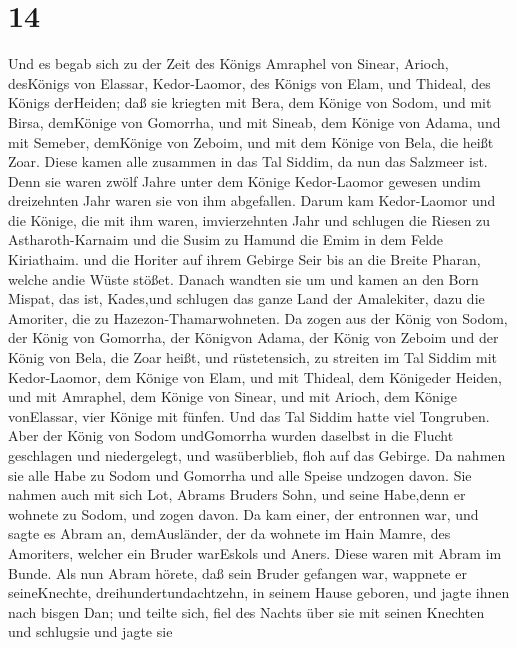 \hypertarget{section-13}{%
\section{14}\label{section-13}}

 Und es begab sich zu der Zeit des Königs Amraphel von
Sinear, Arioch, desKönigs von Elassar, Kedor-Laomor, des Königs von
Elam, und Thideal, des Königs derHeiden;  daß sie kriegten
mit Bera, dem Könige von Sodom, und mit Birsa, demKönige von Gomorrha,
und mit Sineab, dem Könige von Adama, und mit Semeber, demKönige von
Zeboim, und mit dem Könige von Bela, die heißt Zoar.  Diese
kamen alle zusammen in das Tal Siddim, da nun das Salzmeer ist.
 Denn sie waren zwölf Jahre unter dem Könige Kedor-Laomor
gewesen undim dreizehnten Jahr waren sie von ihm abgefallen.
 Darum kam Kedor-Laomor und die Könige, die mit ihm waren,
imvierzehnten Jahr und schlugen die Riesen zu Astharoth-Karnaim und die
Susim zu Hamund die Emim in dem Felde Kiriathaim.  und die
Horiter auf ihrem Gebirge Seir bis an die Breite Pharan, welche andie
Wüste stößet.  Danach wandten sie um und kamen an den Born
Mispat, das ist, Kades,und schlugen das ganze Land der Amalekiter, dazu
die Amoriter, die zu Hazezon-Thamarwohneten.  Da zogen aus
der König von Sodom, der König von Gomorrha, der Königvon Adama, der
König von Zeboim und der König von Bela, die Zoar heißt, und
rüstetensich, zu streiten im Tal Siddim  mit Kedor-Laomor,
dem Könige von Elam, und mit Thideal, dem Königeder Heiden, und mit
Amraphel, dem Könige von Sinear, und mit Arioch, dem Könige vonElassar,
vier Könige mit fünfen.  Und das Tal Siddim hatte viel
Tongruben. Aber der König von Sodom undGomorrha wurden daselbst in die
Flucht geschlagen und niedergelegt, und wasüberblieb, floh auf das
Gebirge.  Da nahmen sie alle Habe zu Sodom und Gomorrha und
alle Speise undzogen davon.  Sie nahmen auch mit sich Lot,
Abrams Bruders Sohn, und seine Habe,denn er wohnete zu Sodom, und zogen
davon.  Da kam einer, der entronnen war, und sagte es Abram
an, demAusländer, der da wohnete im Hain Mamre, des Amoriters, welcher
ein Bruder warEskols und Aners. Diese waren mit Abram im Bunde.
 Als nun Abram hörete, daß sein Bruder gefangen war,
wappnete er seineKnechte, dreihundertundachtzehn, in seinem Hause
geboren, und jagte ihnen nach bisgen Dan;  und teilte sich,
fiel des Nachts über sie mit seinen Knechten und schlugsie und jagte sie
